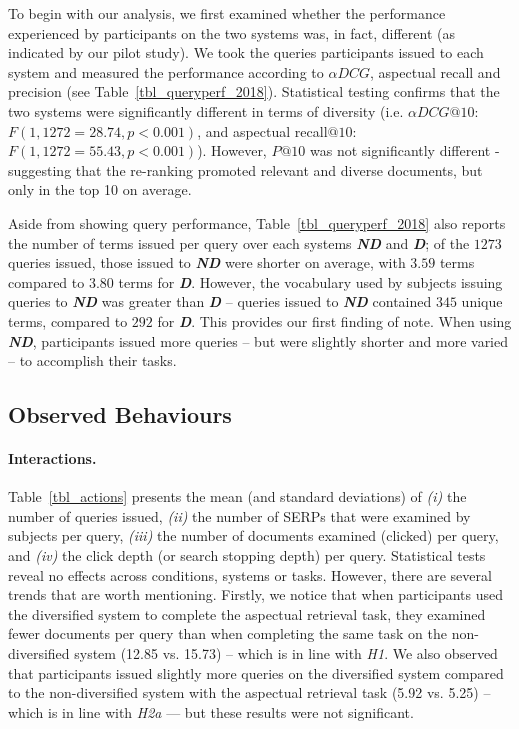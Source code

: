 To begin with our analysis, we first examined whether the performance experienced by participants on the two systems was, in fact, different (as indicated by our pilot study). We took the queries participants issued to each system and measured the performance according to $\alpha DCG$, aspectual recall and precision (see Table~\ref{tbl_queryperf_2018}). Statistical testing confirms that the two systems were significantly different 
 in terms of diversity (i.e. $\alpha DCG@10$: $F(1, 1272=28.74, p<0.001)$, and aspectual recall$@10$: $F(1, 1272=55.43, p<0.001)$). However, $P@10$ was not significantly different - suggesting that the re-ranking promoted relevant and diverse documents, but only in the top 10 on average.
 
 Aside from showing query performance, Table~\ref{tbl_queryperf_2018} also reports the number of terms issued per query over each systems \textbf{\emph{ND}} and \textbf{\emph{D}}; of the $1273$ queries issued, those issued to \textbf{\emph{ND}} were shorter on average, with $3.59$ terms compared to $3.80$ terms for \textbf{\emph{D}}. However, the vocabulary used by subjects issuing queries to \textbf{\emph{ND}} was greater than \textbf{\emph{D}} -- queries issued to \textbf{\emph{ND}} contained $345$ unique terms, compared to $292$ for \textbf{\emph{D}}.
This provides our first finding of note. When using \textbf{\emph{ND}}, participants issued more queries -- but were slightly shorter and more varied -- to accomplish their tasks. 

\subsection{Observed Behaviours}
\paragraph{Interactions.} Table~\ref{tbl_actions} presents the mean (and standard deviations) of \textit{(i)} the number of queries issued, \textit{(ii)} the number of SERPs that were examined by subjects per query, \textit{(iii)} the number of documents examined (clicked) per query, and \textit{(iv)} the click depth (or search stopping depth) per query. %
Statistical tests reveal no effects across conditions, systems or tasks. However, there are several trends that are worth mentioning. Firstly, we notice that when participants used the diversified system to complete the aspectual retrieval task, they examined fewer documents per query than when completing the same task on the non-diversified system (12.85 vs. 15.73) -- which is in line with \emph{H1}. We also observed that participants issued slightly more queries on the diversified system compared to the non-diversified system with the aspectual retrieval task (5.92 vs. 5.25) -- which is in line with \emph{H2a} --- but these results were not significant.

